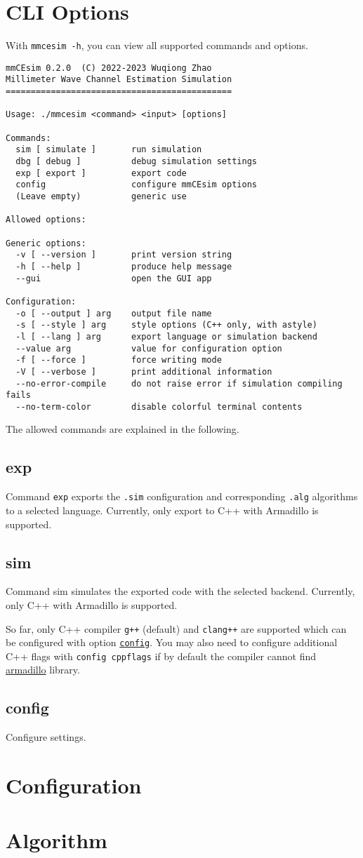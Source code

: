 \section{CLI Options}
With \texttt{mmcesim -h}, you can view all supported commands and options.
\begin{lstlisting}
mmCEsim 0.2.0  (C) 2022-2023 Wuqiong Zhao
Millimeter Wave Channel Estimation Simulation
=============================================

Usage: ./mmcesim <command> <input> [options]

Commands:
  sim [ simulate ]       run simulation
  dbg [ debug ]          debug simulation settings
  exp [ export ]         export code
  config                 configure mmCEsim options
  (Leave empty)          generic use

Allowed options:

Generic options:
  -v [ --version ]       print version string
  -h [ --help ]          produce help message
  --gui                  open the GUI app

Configuration:
  -o [ --output ] arg    output file name
  -s [ --style ] arg     style options (C++ only, with astyle)
  -l [ --lang ] arg      export language or simulation backend
  --value arg            value for configuration option
  -f [ --force ]         force writing mode
  -V [ --verbose ]       print additional information
  --no-error-compile     do not raise error if simulation compiling fails
  --no-term-color        disable colorful terminal contents
\end{lstlisting}

The allowed commands are explained in the following.

\subsection{exp}
Command \texttt{exp} exports the \texttt{.sim} configuration and corresponding \texttt{.alg} algorithms
to a selected language.
Currently, only export to C++ with Armadillo is supported.

\subsection{sim}
Command sim simulates the exported code with the selected backend. Currently, only C++ with Armadillo is supported.

So far, only C++ compiler \texttt{g++} (default) and \texttt{clang++} are supported which can be configured with option \hyperref[d:subsec:config]{\texttt{config}}.
You may also need to configure additional C++ flags with \texttt{config cppflags} if by default the compiler cannot find
\href{https://arma.sourceforge.net/}{armadillo}
library.

\subsection{config}\label{d:subsec:config}
Configure settings.

\section{Configuration}

\section{Algorithm}
